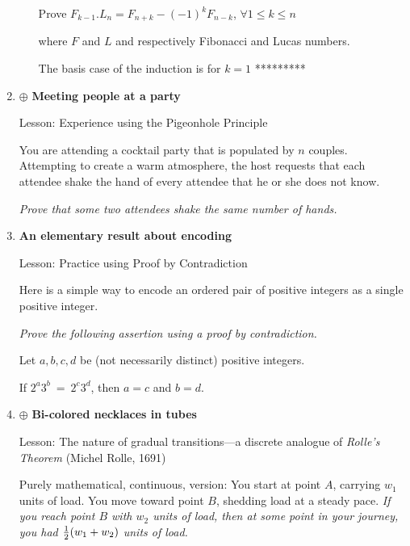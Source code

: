 \begin{enumerate}
\begin{enumerate}
{Prove $F_{k-1}.L_n = F_{n+k} - (-1)^k F_{n-k}$, $\forall 1 \leq k \leq n$

where $F$ and $L$ and respectively Fibonacci and Lucas numbers.

The basis case of the induction is for $k=1$
*********}
  \end{enumerate}


\medskip\item
$\oplus$
{\bf Meeting people at a party}

{\sc Lesson:} Experience using the Pigeonhole Principle

\smallskip

You are attending a cocktail party that is populated by $n$ couples.  Attempting to create a warm atmosphere, the host requests that each attendee shake the hand of every attendee that he or she does not know.

\smallskip

{\em Prove that some two attendees shake the same number of hands.}
\medskip

\medskip\item
{\bf An elementary result about encoding}

{\sc Lesson:} Practice using Proof by Contradiction

\smallskip

Here is a simple way to encode an ordered pair of positive integers as a single positive integer.

\smallskip

{\em Prove the following assertion using a proof by contradiction.}

\begin{prop}
Let $a, b, c, d$ be (not necessarily distinct) positive integers.

If $2^a 3^b \ = \ 2^c 3^d$, then $a=c$ and $b=d$.
\end{prop}

\medskip\item
$\oplus$
{\bf Bi-colored necklaces in tubes}

 

{\sc Lesson:} The nature of gradual transitions---a discrete analogue of {\em Rolle's Theorem} {\small (Michel Rolle, 1691)}

\smallskip

{\small\sf Purely mathematical, continuous, version}:
You start at point $A$, carrying $w_1$ units of load. You move toward point $B$, shedding load at a steady pace.  {\em If you reach point $B$ with $w_2$ units of load, then at some point in your journey, you had ${1 \over 2} (w_1 + w_2)$ units of load.}


\end{enumerate}
